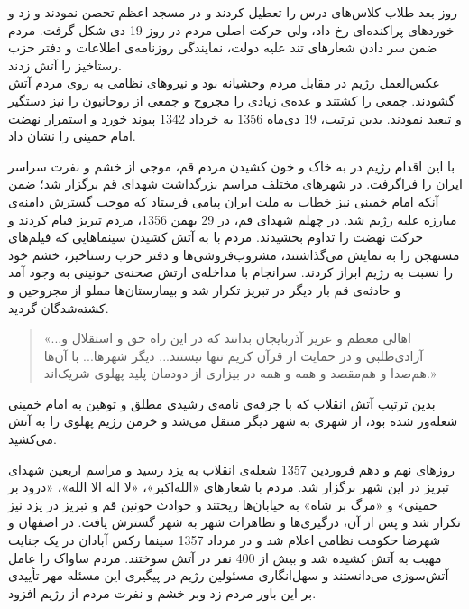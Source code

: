 \documentclass{article}
\begin{document}
\par
روز بعد طلاب کلاس‌های درس را تعطیل کردند و در مسجد اعظم تحصن نمودند و زد و خوردهای پراکنده‌ای رخ داد، ولی حرکت اصلی مردم در روز 19 دی شکل گرفت. مردم ضمن سر دادن شعارهای تند علیه دولت، نمایندگی روزنامه‌ی اطلاعات و دفتر حزب رستاخیز را آتش زدند. \\ عکس‌العمل رژیم در مقابل مردم وحشیانه بود و نیروهای نظامی به روی مردم آتش گشودند. جمعی را کشتند و عده‌ی زیادی را مجروح و جمعی از روحانیون را نیز دستگیر و تبعید نمودند. بدین ترتیب، 19 دی‌ماه 1356 به خرداد 1342 پیوند خورد و استمرار نهضت امام خمینی را نشان داد.
\par
با این اقدام رژیم در به خاک و خون کشیدن مردم قم، موجی از خشم و نفرت سراسر ایران را فراگرفت. در شهرهای مختلف مراسم بزرگداشت شهدای قم برگزار شد؛ ضمن آنکه امام خمینی نیز خطاب به ملت ایران پیامی فرستاد که موجب گسترش دامنه‌ی مبارزه علیه رژیم شد. در چهلم شهدای قم، در 29 بهمن 1356، مردم تبریز قیام کردند و حرکت نهضت را تداوم بخشیدند. مردم با به آتش کشیدن سینماهایی که فیلم‌های مستهجن را به نمایش می‌گذاشتند، مشروب‌فروشی‌ها و دفتر حزب رستاخیز، خشم خود را نسبت به رژیم ابراز کردند. سرانجام با مداخله‌ی ارتش صحنه‌ی خونینی به وجود آمد و حادثه‌ی قم بار دیگر در تبریز تکرار شد و بیمارستان‌ها مملو از مجروحین و کشته‌شدگان گردید.
\par
\begin{quote}
«...اهالی معظم و عزیز آذربایجان بدانند که در این راه حق و استقلال و آزادی‌طلبی و در حمایت از قرآن کریم تنها نیستند... دیگر شهرها... با آن‌ها هم‌صدا و هم‌مقصد و همه و همه در بیزاری از دودمان پلید پهلوی شریک‌اند.» 
\end{quote}
بدین ترتیب آتش انقلاب که با جرقه‌ی نامه‌ی رشیدی مطلق و توهین به امام خمینی شعله‌ور شده بود، از شهری به شهر دیگر منتقل می‌شد و خرمن رژیم پهلوی را به آتش می‌کشید.
\par
روزهای نهم و دهم فروردین 1357 شعله‌ی انقلاب به یزد رسید و مراسم اربعین شهدای تبریز در این شهر برگزار شد. مردم با شعارهای «الله‌اکبر»، «لا اله الا الله»، «درود بر خمینی» و «مرگ بر شاه» به خیابان‌ها ریختند و حوادث خونین قم و تبریز در یزد نیز تکرار شد و پس از آن، درگیری‌ها و تظاهرات شهر به شهر گسترش یافت. در اصفهان و شهرضا حکومت نظامی اعلام شد و در مرداد 1357 سینما رکس آبادان در یک جنایت مهیب به آتش کشیده شد و بیش از 400 نفر در آتش سوختند. مردم ساواک را عامل آتش‌سوزی می‌دانستند و سهل‌انگاری مسئولین رژیم در پیگیری این مسئله مهر تأییدی بر این باور مردم زد وبر خشم و نفرت مردم از رژیم افزود. 
\end{document}

